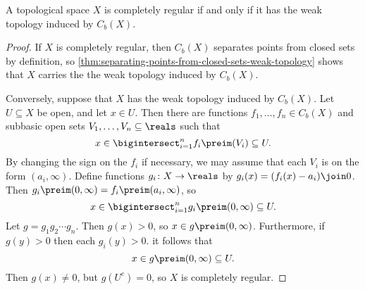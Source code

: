 \documentclass[article, a4paper, 11pt, oneside]{memoir}
\numberwithin{equation}{chapter}
\begin{document}
\begin{theorem}
    \label{thm:completely-regular-weak-topology}
    A topological space $X$ is completely regular if and only if it has the weak topology induced by $C_b(X)$.
\end{theorem}

\begin{proof}
    If $X$ is completely regular, then $C_b(X)$ separates points from closed sets by definition, so \cref{thm:separating-points-from-closed-sets-weak-topology} shows that $X$ carries the the weak topology induced by $C_b(X)$.

    Conversely, suppose that $X$ has the weak topology induced by $C_b(X)$. Let $U \subseteq X$ be open, and let $x \in U$. Then there are functions $f_1, \ldots, f_n \in C_b(X)$ and subbasic open sets $V_1, \ldots, V_n \subseteq \reals$ such that
    \begin{equation*}
        x
            \in \bigintersect_{i=1}^n f_i\preim(V_i)
            \subseteq U.
    \end{equation*}
    By changing the sign on the $f_i$ if necessary, we may assume that each $V_i$ is on the form $(a_i, \infty)$. Define functions $g_i \colon X \to \reals$ by $g_i(x) = (f_i(x) - a_i) \join 0$. Then $g_i\preim(0,\infty) = f_i\preim(a_i,\infty)$, so
    \begin{equation*}
        x
            \in \bigintersect_{i=1}^n g_i\preim(0,\infty)
            \subseteq U.
    \end{equation*}
    Let $g = g_1 g_2 \cdots g_n$. Then $g(x) > 0$, so $x \in g\preim(0,\infty)$. Furthermore, if $g(y) > 0$ then each $g_i(y) > 0$. it follows that
    \begin{equation*}
        x
            \in g\preim(0,\infty)
            \subseteq U.
    \end{equation*}
    Then $g(x) \neq 0$, but $g(U^c) = 0$, so $X$ is completely regular.
\end{proof}



    
\end{document}
